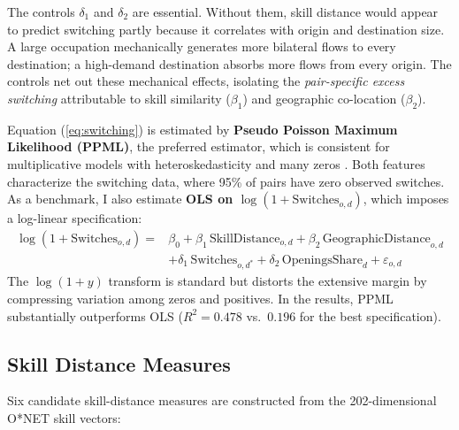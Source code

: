 \documentclass[12pt]{article}
\begin{document}
The controls $\delta_1$ and $\delta_2$ are essential. Without them, skill distance would appear to predict switching partly because it correlates with origin and destination size. A large occupation mechanically generates more bilateral flows to every destination; a high-demand destination absorbs more flows from every origin. The controls net out these mechanical effects, isolating the \emph{pair-specific excess switching} attributable to skill similarity ($\beta_1$) and geographic co-location ($\beta_2$).

Equation (\ref{eq:switching}) is estimated by \textbf{Pseudo Poisson Maximum Likelihood (PPML)}, the preferred estimator, which is consistent for multiplicative models with heteroskedasticity and many zeros \citep{santos2006}. Both features characterize the switching data, where 95\% of pairs have zero observed switches. As a benchmark, I also estimate \textbf{OLS on $\log(1 + \text{Switches}_{o,d})$}, which imposes a log-linear specification:
\begin{equation}
\label{eq:switching_ols}
\begin{aligned}
\log(1 + \text{Switches}_{o,d}) = {} &\beta_0 + \beta_1 \, \text{SkillDistance}_{o,d} + \beta_2 \, \text{GeographicDistance}_{o,d} \\
&+ \delta_1 \, \text{Switches}_{o,d^*} + \delta_2 \, \text{OpeningsShare}_d + \varepsilon_{o,d}
\end{aligned}
\end{equation}
The $\log(1+y)$ transform is standard but distorts the extensive margin by compressing variation among zeros and positives. In the results, PPML substantially outperforms OLS ($R^2 = 0.478$ vs.\ $0.196$ for the best specification).

\subsection{Skill Distance Measures}
\label{sec:strategy_skill}

Six candidate skill-distance measures are constructed from the 202-dimensional O*NET skill vectors:
\end{document}
